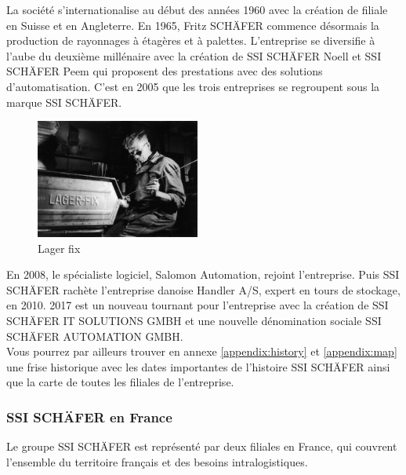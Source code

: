 \documentclass[a4paper, 12pt, french]{article}
\begin{document}
	La société s'internationalise au début des années 1960 avec la création de filiale en Suisse et en Angleterre. En 1965, Fritz SCHÄFER commence désormais la production de rayonnages à étagères et à palettes. L'entreprise se diversifie à l'aube du deuxième millénaire avec la création de SSI SCHÄFER Noell et SSI SCHÄFER Peem qui proposent des prestations avec des solutions d'automatisation. C'est en 2005 que les trois entreprises se regroupent sous la marque SSI SCHÄFER.\\

				\begin{figure}
					\label{fig:lager}
					\vspace{-20pt}
					\begin{center}
						\includegraphics[width=0.48\textwidth]{images/lager_fix.jpg}
					\end{center}
					\vspace{-20pt}
					\caption{Lager fix}
					\vspace{-10pt}
				\end{figure}

	En 2008, le spécialiste logiciel, Salomon Automation, rejoint l'entreprise. Puis SSI SCHÄFER rachète l'entreprise danoise Handler A/S, expert en tours de stockage, en 2010. 2017 est un nouveau tournant pour l'entreprise avec la création de SSI SCHÄFER IT SOLUTIONS GMBH et une nouvelle dénomination sociale SSI SCHÄFER AUTOMATION GMBH.\\
			
	Vous pourrez par ailleurs trouver en annexe \ref{appendix:history} et \ref{appendix:map} une frise historique avec les dates importantes de l'histoire SSI SCHÄFER ainsi que la carte de toutes les filiales de l'entreprise.

			\subsubsection{SSI SCHÄFER en France}
	Le groupe SSI SCHÄFER est représenté par deux filiales en France, qui couvrent l'ensemble du territoire français et des besoins intralogistiques.\\
\end{document}
